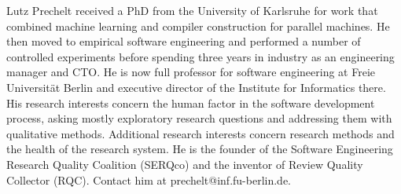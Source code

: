 \documentclass[10pt,journal,compsoc]{IEEEtran}
\newcommand{\ifarxiv}[1]{#1}  %
\begin{document}
\begin{IEEEbiography}{Lutz Prechelt}
received a PhD from the University of Karlsruhe
for work that combined machine learning and compiler construction
for parallel machines.
He then moved to empirical software engineering and performed
a number of controlled experiments before spending three
years in industry as an engineering manager and CTO.
He is now full professor for software engineering at
Freie Universität Berlin and executive director of the
Institute for Informatics there.
His research interests concern the human
factor in the software development process, asking mostly
exploratory research questions and addressing them with
qualitative methods.
Additional research interests concern research methods
and the health of the research system.
He is the founder of the 
Software Engineering Research Quality Coalition (SERQco)
and the inventor of Review Quality Collector (RQC).
Contact him at prechelt@inf.fu-berlin.de.
\end{IEEEbiography}




\ifarxiv{}
\end{document}
